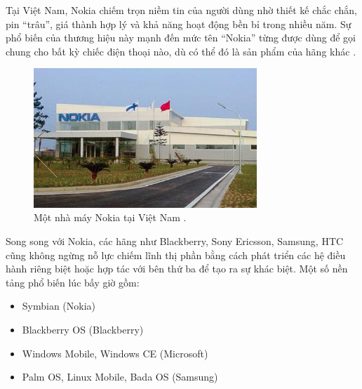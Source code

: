   \begin{flushleft}
  \hspace*{0.8cm}Tại Việt Nam, Nokia chiếm trọn niềm tin của người dùng nhờ thiết kế chắc chắn, pin “trâu”, giá thành hợp lý và khả năng hoạt động bền bỉ trong nhiều năm. Sự phổ biến của thương hiệu này mạnh đến mức tên “Nokia” từng được dùng để gọi chung cho bất kỳ chiếc điện thoại nào, dù có thể đó là sản phẩm của hãng khác \cite{nokia-vietnam-popularity}.
  \end{flushleft}

\begin{figure}[H]
  \centering
  \includegraphics[width=0.75\textwidth]{images/nokia-4d687.jpg}
  \caption{Một nhà máy Nokia tại Việt Nam \cite{vneconomyNokia}.}
  \label{fig:fig8}
\end{figure}

  \begin{flushleft}
  \hspace*{0.8cm}Song song với Nokia, các hãng như Blackberry, Sony Ericsson, Samsung, HTC cũng không ngừng nỗ lực chiếm lĩnh thị phần bằng cách phát triển các hệ điều hành riêng biệt hoặc hợp tác với bên thứ ba để tạo ra sự khác biệt. Một số nền tảng phổ biến lúc bấy giờ gồm:
  \begin{itemize}
  \item Symbian (Nokia)
  \item Blackberry OS (Blackberry)
  \item Windows Mobile, Windows CE (Microsoft)
  \item Palm OS, Linux Mobile, Bada OS (Samsung)
  \end{itemize}
  \end{flushleft}
  

